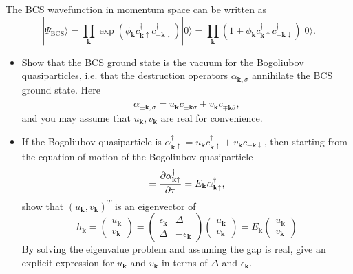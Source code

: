 \begin{Problem}

The BCS wavefunction in momentum space can be written as
\begin{equation}
|\Psi_{\mathrm{BCS}}\rangle
= \prod_{\mathbf{k}} \exp\left( \phi_{\mathbf{k}} c^\dagger_{\mathbf{k}\uparrow} c^\dagger_{-\mathbf{k}\downarrow} \right)|0\rangle
= \prod_{\mathbf{k}} \left(1 + \phi_{\mathbf{k}} c^\dagger_{\mathbf{k}\uparrow} c^\dagger_{-\mathbf{k}\downarrow}\right)|0\rangle .
\end{equation}

\begin{itemize}
\item Show that the BCS ground state is the vacuum for the Bogoliubov quasiparticles, i.e. that the destruction operators $\alpha_{\mathbf{k},\sigma}$ annihilate the BCS ground state. Here
\begin{equation}
\alpha_{\pm\mathbf{k},\sigma} = u_{\mathbf{k}} c_{\pm\mathbf{k}\sigma} + v_{\mathbf{k}} c^\dagger_{\mp\mathbf{k}\overline{\sigma}},
\end{equation}
and you may assume that $u_{\mathbf{k}}, v_{\mathbf{k}}$ are real for convenience.

\item If the Bogoliubov quasiparticle is $\alpha^\dagger_{\mathbf{k}\uparrow} = u_{\mathbf{k}} c^\dagger_{\mathbf{k}\uparrow} + v_{\mathbf{k}} c_{-\mathbf{k}\downarrow}$, then starting from the equation of motion of the Bogoliubov quasiparticle
\begin{equation}
	[H,\alpha^\dagger_{\mathbf{k}\uparrow}] = \pdv{\alpha_{\mathbf{k}\uparrow}^\dagger}{\tau}=E_{\mathbf{k}} \alpha^\dagger_{\mathbf{k}\uparrow},
\end{equation}
show that $(u_{\mathbf{k}}, v_{\mathbf{k}})^T$ is an eigenvector of
\begin{equation}
	h_{\mathbf{k}} = \begin{pmatrix} u_{\mathbf{k}} \\ v_{\mathbf{k}} \end{pmatrix} = \begin{pmatrix} \epsilon_{\mathbf{k}} & \Delta \\ \Delta & -\epsilon_{\mathbf{k}} \end{pmatrix} \begin{pmatrix} u_{\mathbf{k}} \\ v_{\mathbf{k}} \end{pmatrix} = E_{\mathbf{k}} \begin{pmatrix} u_{\mathbf{k}} \\ v_{\mathbf{k}} \end{pmatrix}  
\end{equation}
By solving the eigenvalue problem and assuming the gap is real, give  an explicit expression for $u_{\mathbf{k}}$ and $v_{\mathbf{k}}$ in terms of $\Delta$ and $\epsilon_{\mathbf{k}}$. 
\end{itemize}
\end{Problem}
